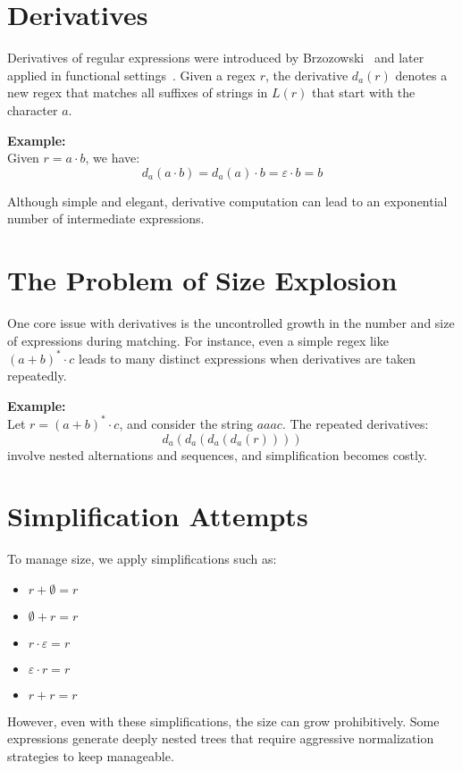 \documentclass[11pt]{article}
\begin{document}
\section{Derivatives}

Derivatives of regular expressions were introduced by Brzozowski~\cite{Brzozowski1964} and later applied in functional settings~\cite{Owens2009, Might2009}. Given a regex $r$, the derivative $d_a(r)$ denotes a new regex that matches all suffixes of strings in $L(r)$ that start with the character $a$. 

\textbf{Example:}\\
Given $r = a \cdot b$, we have:
\[
d_a(a \cdot b) = d_a(a) \cdot b = \varepsilon \cdot b = b
\]

Although simple and elegant, derivative computation can lead to an exponential number of intermediate expressions.

\section{The Problem of Size Explosion}

One core issue with derivatives is the uncontrolled growth in the number and size of expressions during matching. For instance, even a simple regex like $(a + b)^* \cdot c$ leads to many distinct expressions when derivatives are taken repeatedly.

\textbf{Example:}\\
Let $r = (a + b)^* \cdot c$, and consider the string $aaac$. The repeated derivatives:
\[
d_a(d_a(d_a(d_a(r)))) 
\]
involve nested alternations and sequences, and simplification becomes costly.

\section{Simplification Attempts}

To manage size, we apply simplifications such as:
\begin{itemize}
    \item $r + \emptyset = r$
    \item $\emptyset + r = r$
    \item $r \cdot \varepsilon = r$
    \item $\varepsilon \cdot r = r$
    \item $r + r = r$
\end{itemize}

However, even with these simplifications, the size can grow prohibitively. Some expressions generate deeply nested trees that require aggressive normalization strategies to keep manageable.
\end{document}
